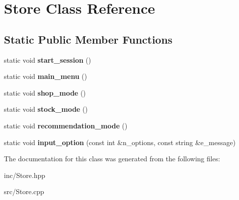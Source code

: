 \hypertarget{class_store}{}\section{Store Class Reference}
\label{class_store}
\subsection*{Static Public Member Functions}
\begin{DoxyCompactItemize}
\item 
\mbox{\label{class_store_af47a60a210ac3c173f4b1d341e156d6b}} 
static void {\bfseries start\+\_\+session} ()
\item 
\mbox{\label{class_store_a25bb5f118c857559dac732a8060492c3}} 
static void {\bfseries main\+\_\+menu} ()
\item 
\mbox{\label{class_store_a315768e57e06ea5de3e0ab8ccc224356}} 
static void {\bfseries shop\+\_\+mode} ()
\item 
\mbox{\label{class_store_a6d3e577633bb7636bbf8bb46163eed6b}} 
static void {\bfseries stock\+\_\+mode} ()
\item 
\mbox{\label{class_store_a44626a175e2bf648fc11749a156bb68f}} 
static void {\bfseries recommendation\+\_\+mode} ()
\item 
\mbox{\label{class_store_aae0571b011a7a886d5ee27477796911b}} 
static void {\bfseries input\+\_\+option} (const int \&n\+\_\+options, const string \&e\+\_\+message)
\end{DoxyCompactItemize}


The documentation for this class was generated from the following files\+:\begin{DoxyCompactItemize}
\item 
inc/Store.\+hpp\item 
src/Store.\+cpp\end{DoxyCompactItemize}
